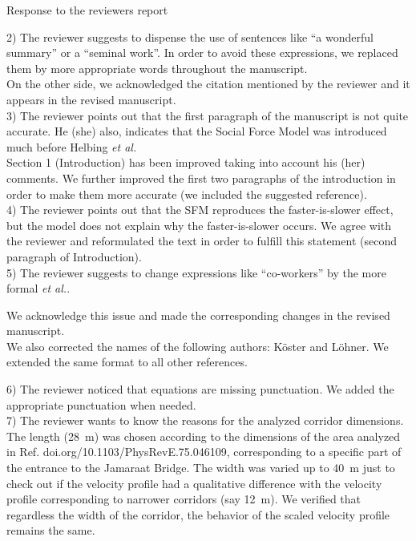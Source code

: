 \documentclass[a4paper,12pt]{letter}
\begin{document}
\begin{letter}{Response to the reviewers report}
{2) The reviewer suggests to dispense the use of sentences like ``a wonderful 
summary'' or a ``seminal work''. In order to avoid these expressions, we 
replaced them by more appropriate words throughout the manuscript. \\

On the other side, we acknowledged the citation mentioned by the reviewer and 
it appears in the revised manuscript. \\

3) The reviewer points out that the first paragraph of the manuscript is not 
quite accurate. He (she) also, indicates that the Social Force Model was introduced much 
before Helbing \textit{et al.} \\

Section 1 (Introduction) has been improved taking into account his (her) 
comments. We further improved the first two paragraphs of the introduction in order to 
make them more accurate (we included the suggested reference). \\ 

4) The reviewer points out that the SFM reproduces the faster-is-slower effect, but the model
does not explain why the faster-is-slower occurs. We agree with the reviewer and reformulated 
the text in order to fulfill this statement (second paragraph of Introduction).\\


5) The reviewer suggests to change expressions like ``co-workers'' by 
the more formal \textit{et al.}. 

We acknowledge this issue and made the corresponding changes in the
revised manuscript. \\

We also corrected the names of the following authors: K\"oster and L\"ohner. We extended the same format to all other references.   

6) The reviewer noticed that equations are missing punctuation. We added the appropriate punctuation when needed. \\

7) The reviewer wants to know the reasons for the analyzed corridor dimensions. 
\\

The length (28~m) was chosen according to the dimensions of the area analyzed
in Ref. doi.org/10.1103/PhysRevE.75.046109,  corresponding to a specific part 
of the entrance to the Jamaraat Bridge. 
The width was varied up to 40~m just to check out if the velocity profile had a
qualitative difference with the velocity profile corresponding to narrower 
corridors (say 12~m). We verified that regardless the width of the corridor, 
the behavior of the scaled velocity profile remains the same. 

}
\end{letter}
\end{document}
